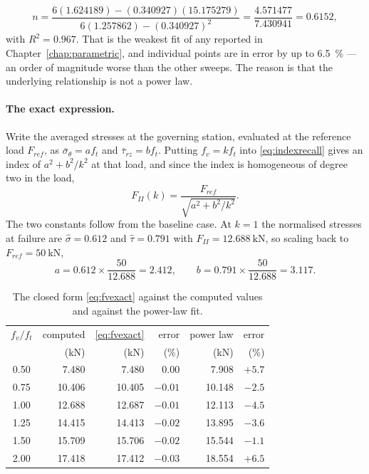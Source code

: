 \begin{equation}
n = \frac{6(1.624189) - (0.340927)(15.175279)}
         {6(1.257862) - (0.340927)^2}
  = \frac{4.571477}{7.430941} = 0.6152 ,
\end{equation}
with $R^2 = 0.967$. That is the weakest fit of any reported in
Chapter~\ref{chap:parametric}, and individual points are in error by up to
\SI{6.5}{\percent} --- an order of magnitude worse than the other sweeps.
The reason is that the underlying relationship is not a power law.

\paragraph{The exact expression.}
Write the averaged stresses at the governing station, evaluated at the
reference load $F_{ref}$, as $\bar\sigma_\theta = a f_t$ and
$\bar\tau_{rz} = b f_t$. Putting $f_v = k f_t$ into
\eqref{eq:indexrecall} gives an index of $a^2 + b^2/k^2$ at that load, and
since the index is homogeneous of degree two in the load,
\begin{equation}
\label{eq:fvexact}
F_{II}(k) = \frac{F_{ref}}{\sqrt{a^2 + b^2/k^2}} .
\end{equation}
The two constants follow from the baseline case. At $k = 1$ the normalised
stresses at failure are $\hat\sigma = 0.612$ and $\hat\tau = 0.791$ with
$F_{II} = \SI{12.688}{\kilo\newton}$, so scaling back to
$F_{ref} = \SI{50}{\kilo\newton}$,
\begin{equation}
a = 0.612 \times \frac{50}{12.688} = 2.412 ,
\qquad
b = 0.791 \times \frac{50}{12.688} = 3.117 .
\end{equation}

\begin{table}[H]
\centering
\caption{The closed form \eqref{eq:fvexact} against the computed values
         and against the power-law fit.}
\label{tab:fvexact}
\small
\begin{tabular*}{\linewidth}{@{\extracolsep{\fill}}crrrrr@{}}
\hline
$f_v/f_t$ & computed & \eqref{eq:fvexact} & error & power law & error \\
          & (kN) & (kN) & (\%) & (kN) & (\%) \\
\hline
0.50 & 7.480  & 7.480  & $ 0.00$ & 7.908  & $+5.7$ \\
0.75 & 10.406 & 10.405 & $-0.01$ & 10.148 & $-2.5$ \\
1.00 & 12.688 & 12.687 & $-0.01$ & 12.113 & $-4.5$ \\
1.25 & 14.415 & 14.413 & $-0.02$ & 13.895 & $-3.6$ \\
1.50 & 15.709 & 15.706 & $-0.02$ & 15.544 & $-1.1$ \\
2.00 & 17.418 & 17.412 & $-0.03$ & 18.554 & $+6.5$ \\
\hline
\end{tabular*}
\end{table}

